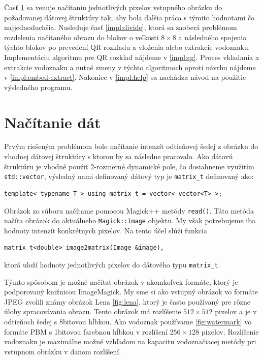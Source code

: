 Časť \ref{impl:load} sa venuje načítaniu jednotlivých pixelov vstupného obrázku do požadovanej dátovej štruktúry tak, aby bola ďalšia práca s týmito hodnotami čo najjednoduchšia. Nasleduje časť \ref{impl:divide}, ktorá sa zaoberá problémom rozdelenia načítaného obrazu do blokov o veľkosti $8\times8$ a následného spojenia týchto blokov po prevedení QR rozkladu a vloženia alebo extrakcie vodoznaku. Implementáciu algoritmu pre QR rozklad nájdeme v \ref{impl:qr}. Proces vkladania a extrakcie vodoznaku a nutné zmeny v týchto algoritmoch oproti návrhu nájdeme v \ref{impl:embed-extract}. Nakoniec v \ref{impl:help} sa nachádza návod na použitie výsledného programu.

\section{Načítanie dát}
\label{impl:load}
Prvým riešeným problémom bolo načítanie intenzít odtieňovej šedej z obrázku do vhodnej dátovej štruktúry s ktorou by sa následne pracovalo. Ako dátovú štruktúru je vhodné použiť 2-rozmerné dynamické pole, čo dosiahneme využitím {\tt std::vector}, výsledný nami definovaný dátový typ je {\tt matrix\_t} definovaný ako:

\begin{lstlisting}
template< typename T > using matrix_t = vector< vector<T> >;
\end{lstlisting}

Obrázok zo súboru načítame pomocou Magick++ metódy {\tt read()}. Táto metóda načíta obrázok do aktuálneho {\tt Magick::Image} objektu. My však potrebujeme iba hodnoty intenzít konkrétnych pixelov. Na tento účel slúži funkcia
\begin{lstlisting}
matrix_t<double> image2matrix(Image &image),
\end{lstlisting}
ktorá uloží hodnoty jednotlivých pixelov do dátového typu {\tt matrix\_t}.

Týmto spôsobom je možné načítať obrázok v akomkoľvek formáte, ktorý je podporovaný knižnicou ImageMagick. My sme si ako vstupný obrázok vo formáte JPEG zvolili známy obrázok Lena \ref{fig:lena}, ktorý je často používaný pre rôzne úlohy spracovávania obrazu. Tento obrázok má rozlíšenie $512\times512$ pixelov a je v odtieňoch šedej s 8bitovou hĺbkou. Ako vodoznak používame \ref{fig:watermark} vo formáte PBM s 1bitovou farebnou hĺbkou v rozlíšení $256\times128$ pixelov. Rozlíšenie vodoznaku je maximálne možné vzhľadom na kapacitu vodoznačiacej metódy pri vstupnom obrázku v danom rozlíšení.

